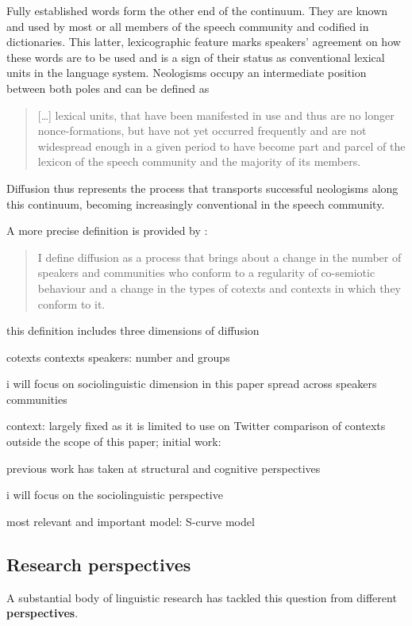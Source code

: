 \documentclass[
  a4paper,
  abstract=on,
  captions=tableabove
  ]{scrartcl}
\renewcommand{\hw}[1]{\textbf{#1}}
\begin{document}
Fully established words form the other end of the continuum. They are known and used by most or all members of the speech community and codified in dictionaries. This latter, lexicographic feature marks speakers' agreement on how these words are to be used and is a sign of their status as conventional lexical units in the language system. Neologisms occupy an intermediate position between both poles and can be defined as

\blockquote[{\cite[31]{Kerremans2015WebNew}}]{
[\dots] lexical units, that have been manifested in use and thus are no longer nonce-formations, but have not yet occurred frequently and are not widespread enough in a given period to have become part and parcel of the lexicon of the speech community and the majority of its members.
}

Diffusion thus represents the process that transports successful neologisms along this continuum, becoming increasingly conventional in the speech community.

A more precise definition is provided by \citeauthor{Schmid2020DynamicsLinguistic}: \blockquote[\cite{Schmid2020DynamicsLinguistic}]{I define diffusion as a process that brings about a change in the number of speakers and communities who conform to a regularity of co-semiotic behaviour and a change in the types of cotexts and contexts in which they conform to it.} 

this definition includes three dimensions of diffusion

  cotexts
  contexts
  speakers: number and groups

i will focus on sociolinguistic dimension in this paper
  spread across
    speakers
    communities

context: largely fixed as it is limited to use on Twitter
  comparison of contexts outside the scope of this paper; initial work: \parencite{Wurschinger2016UsingWeb}

previous work has taken at
  structural and
  cognitive perspectives

i will focus on the sociolinguistic perspective


most relevant and important model: S-curve model

  \subsection{Research perspectives}
    \label{subsec:research-perspectives}

  A substantial body of linguistic research has tackled this question from different \hw{perspectives}. \parencite[16]{Schmid2016EnglishMorphology}
\end{document}
